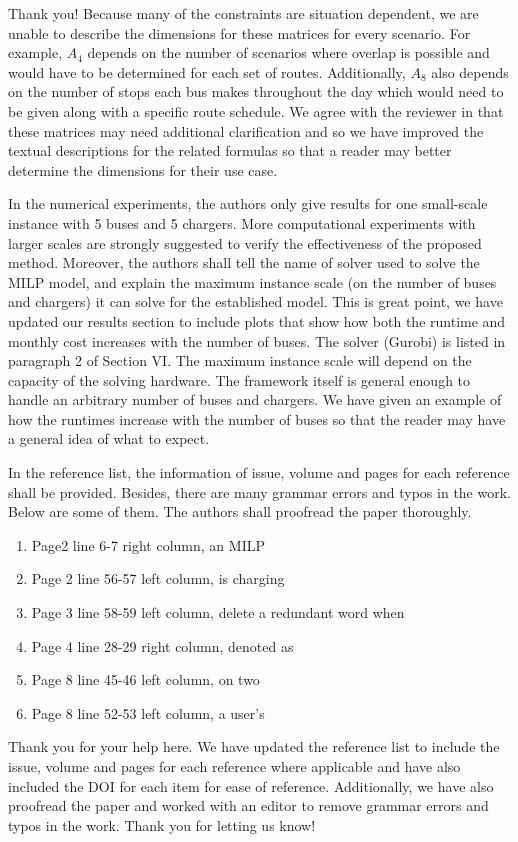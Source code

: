 \documentclass{article}
\begin{document}
\begin{buttkissing}
	\kissbutt Thank you! Because many of the constraints are situation dependent, we are unable to describe the dimensions for these matrices for every scenario.  For example, $A_4$ depends on the number of scenarios where overlap is possible and would have to be determined for each set of routes. Additionally, $A_8$ also depends on the number of stops each bus makes throughout the day which would need to be given along with a specific route schedule. We agree with the reviewer in that these matrices may need additional clarification and so we have improved the textual descriptions for the related formulas so that a reader may better determine the dimensions for their use case. 

	\reviewerclaims  In the numerical experiments, the authors only give results for one small-scale instance with 5 buses and 5 chargers. More computational experiments with larger scales are strongly suggested to verify the effectiveness of the proposed method. Moreover, the authors shall tell the name of solver used to solve the MILP model, and explain the maximum instance scale (on the number of buses and chargers) it can solve for the established model.
	\kissbutt This is great point, we have updated our results section to include plots that show how both the runtime and monthly cost increases with the number of buses. The solver (Gurobi) is listed in paragraph 2 of Section VI. The maximum  instance scale will depend on the capacity of the solving hardware. The framework itself is general enough to handle an arbitrary number of buses and chargers.  We have given an example of how the runtimes increase with the number of buses so that the reader may have a general idea of what to expect.

	\reviewerclaims  In the reference list, the information of issue, volume and pages for each reference shall be provided.
	Besides, there are many grammar errors and typos in the work. Below are some of them. The authors shall proofread the paper thoroughly.
	\begin{enumerate}
	    \item Page2 line 6-7 right column, an MILP
	    \item Page 2 line 56-57 left column, is charging
	    \item Page 3 line 58-59 left column, delete a redundant word when
	    \item Page 4 line 28-29 right column, denoted as
	    \item Page 8 line 45-46 left column, on two
	    \item Page 8 line 52-53 left column, a user’s
	\end{enumerate} 
	\kissbutt Thank you for your help here. We have updated the reference list to include the issue, volume and pages for each reference where applicable and have also included the DOI for each item for ease of reference. Additionally, we have also proofread the paper and worked with an editor to remove grammar errors and typos in the work. Thank you for letting us know!
\end{buttkissing} 
\end{document}
